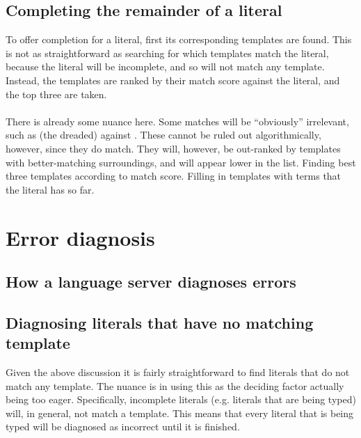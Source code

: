 \documentclass[../main.tex]{subfiles}
\begin{document}
\subsection{Completing the remainder of a literal}
To offer completion for a literal, first its corresponding templates are found. This is not as straightforward as searching for which templates match the literal, because the literal will be incomplete, and so will not match any template. Instead, the templates are ranked by their match score against the literal, and the top three are taken.
\\
\\
There is already some nuance here. Some matches will be ``obviously'' irrelevant, such as (the dreaded)  against . These cannot be ruled out algorithmically, however, since they do match. They will, however, be out-ranked by templates with better-matching surroundings, and will appear lower in the list.
Finding best three templates according to match score. Filling in templates with terms that the literal has so far.
%
%
%
\section{Error diagnosis}
\subsection{How a language server diagnoses errors}

\subsection{Diagnosing literals that have no matching template}
Given the above discussion it is fairly straightforward to find literals that do not match any template. The nuance is in using this as the deciding factor actually being too eager. Specifically, incomplete literals (e.g. literals that are being typed) will, in general, not match a template. This means that every literal that is being typed will be diagnosed as incorrect until it is finished.
\end{document}
